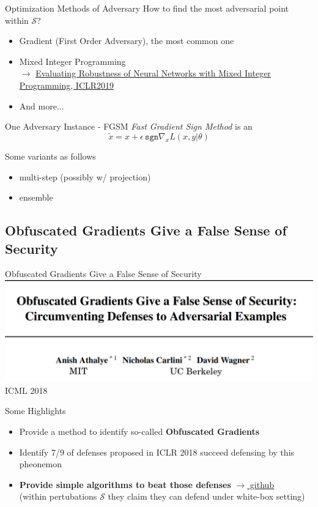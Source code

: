 \documentclass{beamer}
\begin{document}
\begin{frame}{Optimization Methods of Adversary}
  How to find the most adversarial point within $\mathcal{S}$?
  \begin{itemize}
    \item Gradient (First Order Adversary), the most common one
    \item Mixed Integer Programming \\
      $\rightarrow$ \href{https://openreview.net/forum?id=HyGIdiRqtm}{Evaluating Robustness of Neural Networks with Mixed Integer Programming, ICLR2019}
      
    \item And more...
  \end{itemize}
\end{frame}
\begin{frame}{One Adversary Instance - FGSM}
  \textit{Fast Gradient Sign Method} is an   \color{purple}{first-order} \color{black}{adversary}
  \[
    \tilde{x} = x + \epsilon \, \texttt{sgn} \nabla_xL(x,y|\theta)
  \]

  Some variants as follows
  \begin{itemize}
    \item multi-step (possibly w/ projection)
    \item ensemble
  \end{itemize}
\end{frame}

\subsection{Obfuscated Gradients Give a False Sense of Security}
\begin{frame}{Obfuscated Gradients Give a False Sense of Security}
  \includegraphics[width=\textwidth]{fig/ob-grad/ob-grad-title.png}
  \center ICML 2018
\end{frame}

\begin{frame}{Some Highlights}
  \begin{itemize}
    \item Provide a method to identify so-called \textbf{Obfuscated Gradients}
    \item Identify 7/9 of defenses proposed in ICLR 2018 succeed defensing by this pheonemon
    \item \textbf{Provide simple algorithms to beat those defenses} \href{https://github.com/anishathalye/obfuscated-gradients}{$\rightarrow$ github}\\
      (within pertubations $\mathcal{S}$ they claim they can defend under white-box setting)
  \end{itemize}
\end{frame}
\end{document}
